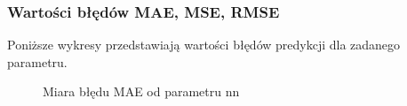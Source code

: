 \documentclass[12pt, a4paper]{article}
\begin{document}
\subsubsection{Wartości błędów MAE, MSE, RMSE}
Poniższe wykresy przedstawiają wartości błędów predykcji dla zadanego parametru.

\begin{figure}[H]
  \begin{center}
  \end{center}
  \caption{Miara błędu MAE od parametru nn}
  \label{fig:ubcf-nn-mae}
\end{figure}
\end{document}

